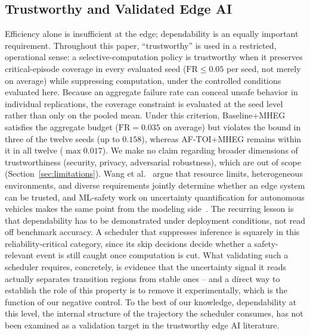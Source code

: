 \documentclass[a4paper,fleqn]{cas-dc}
\begin{document}
\subsection{Trustworthy and Validated Edge AI}
\label{sec:rel_trust}
Efficiency alone is insufficient at the edge; dependability is an equally important requirement.
{\color{\revcolor}Throughout this paper, ``trustworthy'' is used in a restricted,
operational sense: a selective-computation policy is trustworthy when it
preserves critical-episode coverage in every evaluated seed
($\mathrm{FR} \le 0.05$ per seed, not merely on average) while suppressing
computation, under the controlled conditions evaluated here. Because an
aggregate failure rate can conceal unsafe behavior in individual
replications, the coverage constraint is evaluated at the seed level rather
than only on the pooled mean. Under this criterion, Baseline+MHEG satisfies
the aggregate budget ($\mathrm{FR}=0.035$ on average) but violates the bound
in three of the twelve seeds (up to $0.158$), whereas \mbox{AF-TOI}+MHEG
remains within it in all twelve ($\max 0.017$). We make no claim
regarding broader dimensions of trustworthiness (security, privacy, adversarial
robustness), which are out of scope (Section~\ref{sec:limitations}).}
Wang et al.~\cite{wang2025trustworthy} argue that resource limits, heterogeneous
environments, and diverse requirements jointly determine whether an edge system can
be trusted, and ML-safety work on uncertainty quantification for autonomous vehicles
makes the same point from the modeling side~\cite{mcallister2017concrete,mohseni2020mlsafety,hendrycks2022mlsafety}.
The recurring lesson is that dependability has to be demonstrated under deployment
conditions, not read off benchmark accuracy. A scheduler that suppresses inference
is squarely in this reliability-critical category, since its skip decisions decide
whether a safety-relevant event is still caught once computation is cut. What
validating such a scheduler requires, concretely, is evidence that the uncertainty
signal it reads actually separates transition regions from stable ones -- and a direct way to establish the role of this property is to remove it experimentally, which is the function of our negative control. To the best of our knowledge, dependability at this level, the
internal structure of the trajectory the scheduler consumes, has not been examined
as a validation target in the trustworthy edge AI literature.
\end{document}

